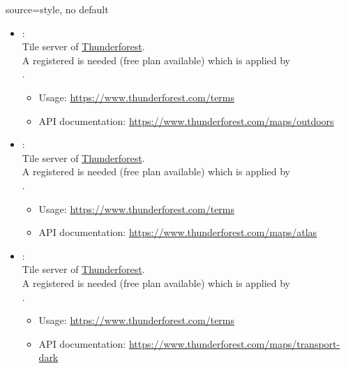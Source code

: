 \begin{docMrcKey}[supply]{source}{=}{style, no default}
\begin{itemize}
\clearpage
  \item{}:\\
    Tile server of \href{https://www.thunderforest.com}{Thunderforest}.\\
    A registered  is needed (free plan available)
    which is applied by\\
    .
    \begin{itemize}
    \item Usage: \url{https://www.thunderforest.com/terms}
    \item API documentation: \url{https://www.thunderforest.com/maps/outdoors}
    \end{itemize}

  \item{}:\\
    Tile server of \href{https://www.thunderforest.com}{Thunderforest}.\\
    A registered  is needed (free plan available)
    which is applied by\\
    .
    \begin{itemize}
    \item Usage: \url{https://www.thunderforest.com/terms}
    \item API documentation: \url{https://www.thunderforest.com/maps/atlas}
    \end{itemize}

  \item{}:\\
    Tile server of \href{https://www.thunderforest.com}{Thunderforest}.\\
    A registered  is needed (free plan available)
    which is applied by\\
    .
    \begin{itemize}
    \item Usage: \url{https://www.thunderforest.com/terms}
    \item API documentation: \url{https://www.thunderforest.com/maps/transport-dark}
    \end{itemize}


\end{itemize}
\end{docMrcKey}
